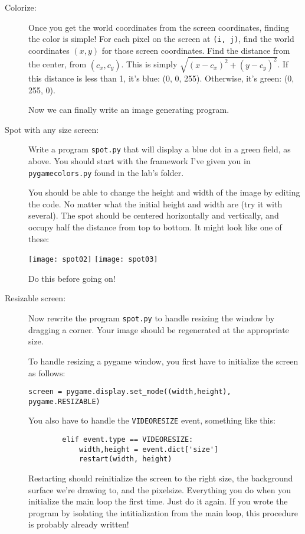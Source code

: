 \documentclass[12pt]{article}
\begin{document}
\begin{description}
\item[Colorize:] Once you get the world coordinates from
the screen coordinates, finding the color is simple!
For each pixel on the screen at \lstinline{(i, j)}, find the
world coordinates $(x,y)$ for those screen coordinates.
Find the distance from the center, from $(c_x, c_y)$.
This is simply $\sqrt{(x-c_x)^2 + (y-c_y)^2}$.
If this distance is less than 1, it's blue: (0, 0, 255).  
Otherwise,
it's green: (0, 255, 0).

Now we can finally write an image generating program.

\item[Spot with any size screen:]  
Write a program \lstinline{spot.py}
that will display a blue dot in a green field, as above.
You should start with the framework I've given you in
\lstinline{pygamecolors.py} found in the lab's folder.

You should be able to change the height and width
of the image by editing the code.
No matter what the initial height and width are (try it
with several). The spot should be centered horizontally
and vertically, and occupy half the distance from top to
bottom.  It might look like one of these:

\texttt{[image: spot02]}\hfill
\texttt{[image: spot03]}\hfill ~

Do this before going on!

\item[Resizable screen:]  Now rewrite the program
\lstinline{spot.py} to handle resizing the window by dragging a corner.
Your image should
be regenerated at the appropriate size.

To handle resizing a pygame window, you first
have to initialize the screen as follows:
\begin{lstlisting}
screen = pygame.display.set_mode((width,height), pygame.RESIZABLE)
\end{lstlisting}
You also have to handle
the \lstinline{VIDEORESIZE} event, something like this:
\begin{lstlisting}
        elif event.type == VIDEORESIZE:
            width,height = event.dict['size']
            restart(width, height)
\end{lstlisting}
Restarting should reinitialize the screen to the right size,
the background surface we're drawing to, and the pixelsize.
Everything you do when you initialize 
the main loop the first time.  Just do it again.
If you wrote the program by isolating the intitialization
from the main loop, this procedure is probably already
written!


\end{description}
\end{document}
